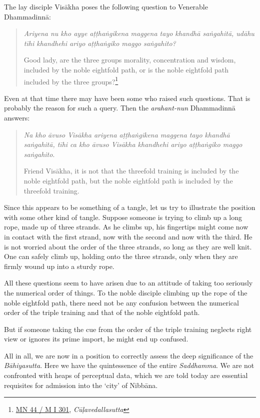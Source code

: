 The lay disciple Visākha poses the following question to Venerable Dhammadinnā:

\begin{quote}
\emph{Ariyena nu kho ayye aṭṭhaṅgikena maggena tayo khandhā saṅgahitā, udāhu tīhi khandhehi ariyo aṭṭhaṅgiko maggo saṅgahito?}

Good lady, are the three groups morality, concentration and wisdom, included by the noble eightfold path, or is the noble eightfold path included by the three groups?\footnote{\href{https://suttacentral.net/mn44/pli/ms}{MN 44 / M I 301}, \emph{Cūḷavedallasutta}}
\end{quote}

Even at that time there may have been some who raised such questions. That is probably the reason for such a query. Then the \emph{arahant-nun} Dhammadinnā answers:

\begin{quote}
\emph{Na kho āvuso Visākha ariyena aṭṭhaṅgikena maggena tayo khandhā saṅgahitā, tīhi ca kho āvuso Visākha khandhehi ariyo aṭṭhaṅgiko maggo saṅgahito}.

Friend Visākha, it is not that the threefold training is included by the noble eightfold path, but the noble eightfold path is included by the threefold training.
\end{quote}

Since this appears to be something of a tangle, let us try to illustrate the position with some other kind of tangle. Suppose someone is trying to climb up a long rope, made up of three strands. As he climbs up, his fingertips might come now in contact with the first strand, now with the second and now with the third. He is not worried about the order of the three strands, so long as they are well knit. One can safely climb up, holding onto the three strands, only when they are firmly wound up into a sturdy rope.

All these questions seem to have arisen due to an attitude of taking too seriously the numerical order of things. To the noble disciple climbing up the rope of the noble eightfold path, there need not be any confusion between the numerical order of the triple training and that of the noble eightfold path.

But if someone taking the cue from the order of the triple training neglects right view or ignores its prime import, he might end up confused.

All in all, we are now in a position to correctly assess the deep significance of the \emph{Bāhiyasutta}. Here we have the quintessence of the entire \emph{Saddhamma}. We are not confronted with heaps of perceptual data, which we are told today are essential requisites for admission into the `city' of Nibbāna.


